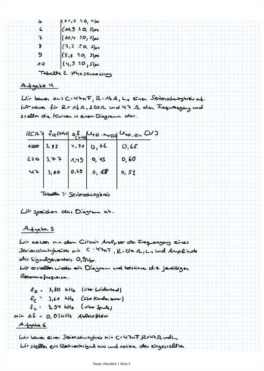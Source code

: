 \documentclass{article}
\begin{document}
\includegraphics[width=\textwidth]{graphics/mess3.jpg}
\newpage
\end{document}

